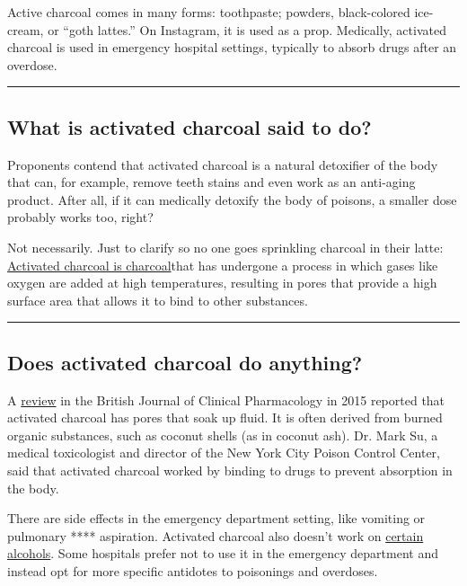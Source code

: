 Active charcoal comes in many forms: toothpaste; powders, black-colored
ice-cream, or ``goth lattes.'' On Instagram, it is used as a prop.
Medically, activated charcoal is used in emergency hospital settings,
typically to absorb drugs after an overdose.

\begin{center}\rule{0.5\linewidth}{\linethickness}\end{center}

\hypertarget{what-is-activated-charcoal-said-to-do}{%
\subsection{What is activated charcoal said to
do?}\label{what-is-activated-charcoal-said-to-do}}

Proponents contend that activated charcoal is a natural detoxifier of
the body that can, for example, remove teeth stains and even work as an
anti-aging product. After all, if it can medically detoxify the body of
poisons, a smaller dose probably works too, right?

Not necessarily. Just to clarify so no one goes sprinkling charcoal in
their latte:
\href{https://www.ncbi.nlm.nih.gov/pmc/articles/PMC4767212/}{Activated
charcoal is charcoal}that has undergone a process in which gases like
oxygen are added at high temperatures, resulting in pores that provide a
high surface area that allows it to bind to other substances.

\begin{center}\rule{0.5\linewidth}{\linethickness}\end{center}

\hypertarget{does-activated-charcoal-do-anything}{%
\subsection{Does activated charcoal do
anything?}\label{does-activated-charcoal-do-anything}}

A \href{https://www.ncbi.nlm.nih.gov/pmc/articles/PMC4767212/}{review}
in the British Journal of Clinical Pharmacology in 2015 reported that
activated charcoal has pores that soak up fluid. It is often derived
from burned organic substances, such as coconut shells (as in coconut
ash). Dr. Mark Su, a medical toxicologist and director of the New York
City Poison Control Center, said that activated charcoal worked by
binding to drugs to prevent absorption in the body.

There are side effects in the emergency department setting, like
vomiting or pulmonary **** aspiration. Activated charcoal also doesn't
work on
\href{https://www.ncbi.nlm.nih.gov/pmc/articles/PMC4767212/\#bcp12793-bib-0013}{certain
alcohols}. Some hospitals prefer not to use it in the emergency
department and instead opt for more specific antidotes to poisonings and
overdoses.

